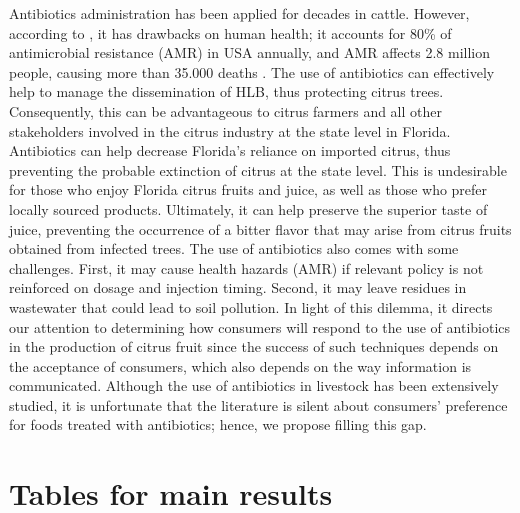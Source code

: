 \documentclass[12pt]{article}
\begin{document}
Antibiotics administration has been applied for decades in cattle. However, according to \citet{hosain_antimicrobial_2021}, it has drawbacks on human health; it accounts for 80\% of antimicrobial resistance (AMR) in USA annually, and AMR affects 2.8 million people, causing more than 35.000 deaths \citep{cdc2019antibiotic}.  The use of antibiotics can effectively help to manage the dissemination of HLB, thus protecting citrus trees. Consequently, this can be advantageous to citrus farmers and all other stakeholders involved in the citrus industry at the state level in Florida. Antibiotics can help decrease Florida's reliance on imported citrus, thus preventing the probable extinction of citrus at the state level. This is undesirable for those who enjoy Florida citrus fruits and juice, as well as those who prefer locally sourced products. Ultimately, it can help preserve the superior taste of juice, preventing the occurrence of a bitter flavor that may arise from citrus fruits obtained from infected trees. The use of antibiotics also comes with some challenges. First, it may cause health hazards (AMR) if relevant policy is not reinforced on dosage and injection timing. Second, it may leave  residues in wastewater that could lead to soil pollution. In light of this dilemma, it directs our attention to determining how consumers will respond to the use of antibiotics in the production of citrus fruit since the success of such techniques depends on the acceptance of consumers, which also depends on the way information is communicated. Although the use of antibiotics in livestock has been extensively studied, it is unfortunate that the literature is silent about consumers’ preference for foods treated with antibiotics; hence, we propose filling this gap.

\clearpage









\clearpage


\section{Tables for main results}
\end{document}
